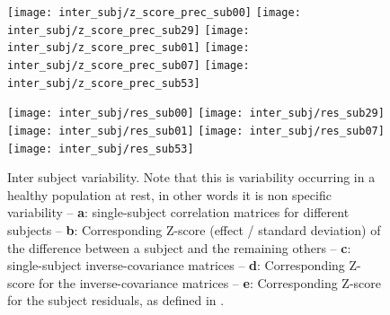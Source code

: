 \documentclass[5p]{elsarticle}
\begin{document}
\begin{figure}
\begin{preview}
    \hspace*{.5ex}%
    \texttt{[image: inter\_subj/z\_score\_prec\_sub00]}%
    \hspace*{-.2ex}%
    \texttt{[image: inter\_subj/z\_score\_prec\_sub29]}%
    \hspace*{-.2ex}%
    \texttt{[image: inter\_subj/z\_score\_prec\_sub01]}%
    \hspace*{-.2ex}%
    \texttt{[image: inter\_subj/z\_score\_prec\_sub07]}%
    \hspace*{-.2ex}%
    \texttt{[image: inter\_subj/z\_score\_prec\_sub53]}%
    \hspace*{.1ex}%



    \hspace*{.5ex}%
    \texttt{[image: inter\_subj/res\_sub00]}%
    \hspace*{-.2ex}%
    \texttt{[image: inter\_subj/res\_sub29]}%
    \hspace*{-.2ex}%
    \texttt{[image: inter\_subj/res\_sub01]}%
    \hspace*{-.2ex}%
    \texttt{[image: inter\_subj/res\_sub07]}%
    \hspace*{-.2ex}%
    \texttt{[image: inter\_subj/res\_sub53]}%
    \hspace*{.1ex}%
    \end{preview}
\fi

\caption{Inter subject variability. Note that this is variability
occurring in a healthy population at rest, in other words it is non specific
variability -- \textbf{a}: single-subject
correlation matrices for different subjects -- \textbf{b}:
Corresponding Z-score (effect / standard deviation) of the difference
between a subject and the remaining others -- \textbf{c}:
single-subject inverse-covariance matrices -- \textbf{d}: Corresponding Z-score
for the inverse-covariance matrices -- \textbf{e}:
Corresponding Z-score for the subject residuals, as defined in 
\cite{varoquaux2010b}.
\label{fig:inter_subject}}
\end{figure}
\end{document}
